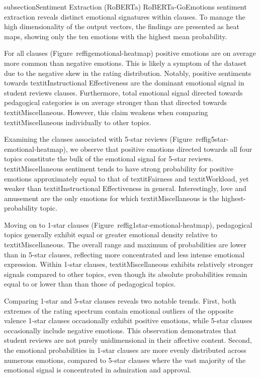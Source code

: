subsection{Sentiment Extraction (RoBERTa)}
RoBERTa-GoEmotions sentiment extraction reveals distinct emotional signatures within clauses. To manage the high dimensionality of the output vectors, the findings are presented as heat maps, showing only the ten emotions with the highest mean probability.

For all clauses (Figure~ref{figemotional-heatmap}) positive emotions are on average more common than negative emotions. This is likely a symptom of the dataset due to the negative skew in the rating distribution. Notably, positive sentiments towards textit{Instructional Effectiveness} are the dominant emotional signal in student reviews clauses. Furthermore, total emotional signal directed towards pedagogical categories is on average stronger than that directed towards textit{Miscellaneous}. However, this claim weakens when comparing textit{Miscellaneous} individually to other topics.

Examining the clauses associated with 5-star reviews (Figure~ref{fig5star-emotional-heatmap}), we observe that positive emotions directed towards all four topics constitute the bulk of the emotional signal for 5-star reviews. textit{Miscellaneous} sentiment tends to have strong probability for positive emotions approximately equal to that of textit{Fairness} and textit{Workload}, yet weaker than textit{Instructional Effectiveness} in general. Interestingly, love and amusement are the only emotions for which textit{Miscellaneous} is the highest-probability topic.

Moving on to 1-star clauses (Figure~ref{fig1star-emotional-heatmap}), pedagogical topics generally exhibit equal or greater emotional density relative to textit{Miscellaneous}. The overall range and maximum of probabilities are lower than in 5-star clauses, reflecting more concentrated and less intense emotional expression. Within 1-star clauses, textit{Miscellaneous} exhibits relatively stronger signals compared to other topics, even though its absolute probabilities remain equal to or lower than than those of pedagogical topics.

Comparing 1-star and 5-star clauses reveals two notable trends. First, both extremes of the rating spectrum contain emotional outliers of the opposite valence 1-star clauses occasionally exhibit positive emotions, while 5-star clauses occasionally include negative emotions. This observation demonstrates that student reviews are not purely unidimensional in their affective content. Second, the emotional probabilities in 1-star clauses are more evenly distributed across numerous emotions, compared to 5-star clauses where the vast majority of the emotional signal is concentrated in admiration and approval.

